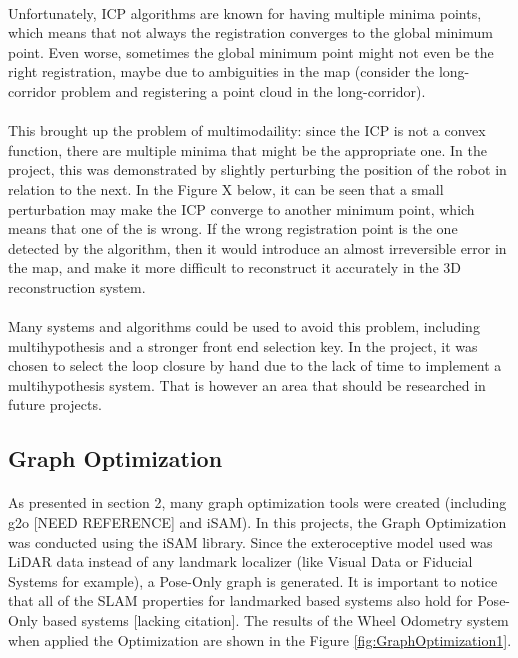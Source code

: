 \documentclass[12pt]{article}
\begin{document}
	\paragraph{}
	Unfortunately, ICP algorithms are known for having multiple minima points, which means that not always the registration converges to the global minimum point. Even worse, sometimes the global minimum point might not even be the right registration, maybe due to ambiguities in the map (consider the long-corridor problem and registering a point cloud in the long-corridor).
	
	\paragraph{}
	This brought up the problem of multimodaility: since the ICP is not a convex function, there are multiple minima that might be the appropriate one. In the project, this was demonstrated by slightly perturbing the position of the robot in relation to the next. In the Figure X below, it can be seen that a small perturbation may make the ICP converge to another minimum point, which means that one of the is wrong. If the wrong registration point is the one detected by the algorithm, then it would introduce an almost irreversible error in the map, and make it more difficult to reconstruct it accurately in the 3D reconstruction system.
	
	\paragraph{}
	Many systems and algorithms could be used to avoid this problem, including multihypothesis and a stronger front end selection key. In the project, it was chosen to select the loop closure by hand due to the lack of time to implement a multihypothesis system. That is however an area that should be researched in future projects.
	\subsection{Graph Optimization}
	\paragraph{}
	As presented in section 2, many graph optimization tools were created (including g2o [NEED REFERENCE] and iSAM). In this projects, the Graph Optimization was conducted using the iSAM library. Since the exteroceptive model used was LiDAR data instead of any landmark localizer (like Visual Data or Fiducial Systems for example), a Pose-Only graph is generated. It is important to notice that all of the SLAM properties for landmarked based systems also hold for Pose-Only based systems [lacking citation].
	The results of the Wheel Odometry system when applied the Optimization are shown in the Figure \ref{fig:GraphOptimization1}.
	
\end{document}

